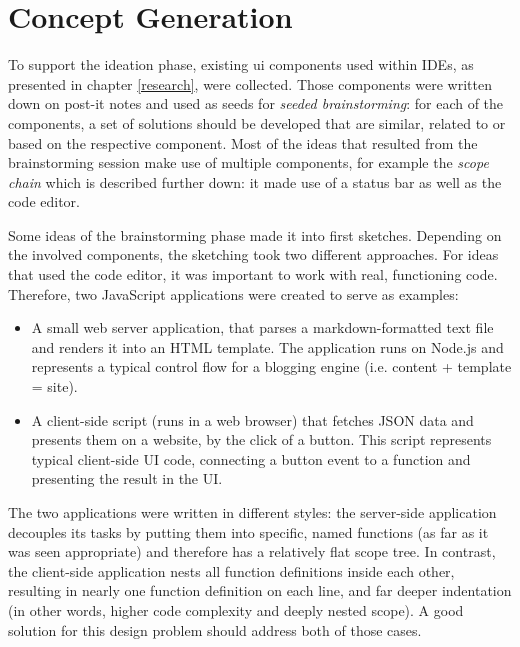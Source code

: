 \section{Concept Generation}\label{concept-generation}

To support the ideation phase, existing \ac{ui} components used within
IDEs, as presented in chapter \ref{research}, were collected. Those
components were written down on post-it notes and used as seeds for
\emph{seeded brainstorming}: for each of the components, a set of
solutions should be developed that are similar, related to or based on
the respective component. Most of the ideas that resulted from the
brainstorming session make use of multiple components, for example the
\emph{scope chain} which is described further down: it made use of a
status bar as well as the code editor.

Some ideas of the brainstorming phase made it into first sketches.
Depending on the involved components, the sketching took two different
approaches. For ideas that used the code editor, it was important to
work with real, functioning code. Therefore, two JavaScript applications
were created to serve as examples:

\begin{itemize}
\itemsep1pt\parskip0pt
\item
  A small web server application, that parses a markdown-formatted text
  file and renders it into an HTML template. The application runs on
  Node.js and represents a typical control flow for a blogging engine
  (i.e. content + template = site).
\item
  A client-side script (runs in a web browser) that fetches JSON data
  and presents them on a website, by the click of a button. This script
  represents typical client-side UI code, connecting a button event to a
  function and presenting the result in the UI.
\end{itemize}

The two applications were written in different styles: the server-side
application decouples its tasks by putting them into specific, named
functions (as far as it was seen appropriate) and therefore has a
relatively flat scope tree. In contrast, the client-side application
nests all function definitions inside each other, resulting in nearly
one function definition on each line, and far deeper indentation (in
other words, higher code complexity and deeply nested scope). A good
solution for this design problem should address both of those cases.

